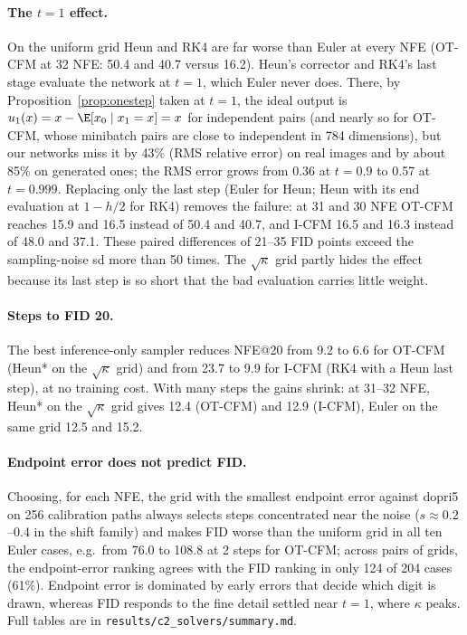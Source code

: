 \paragraph{The $t=1$ effect.} On the uniform grid Heun and RK4 are far worse than Euler at every NFE (OT-CFM at 32 NFE: 50.4 and 40.7 versus 16.2). Heun's corrector and RK4's last stage evaluate the network at $t=1$, which Euler never does. There, by Proposition~\ref{prop:onestep} taken at $t=1$, the ideal output is $u_1(x)=x-\E[x_0\mid x_1=x]=x$ for independent pairs (and nearly so for OT-CFM, whose minibatch pairs are close to independent in 784 dimensions), but our networks miss it by 43\% (RMS relative error) on real images and by about 85\% on generated ones; the RMS error grows from 0.36 at $t=0.9$ to 0.57 at $t=0.999$. Replacing only the last step (Euler for Heun; Heun with its end evaluation at $1-h/2$ for RK4) removes the failure: at 31 and 30 NFE OT-CFM reaches 15.9 and 16.5 instead of 50.4 and 40.7, and I-CFM 16.5 and 16.3 instead of 48.0 and 37.1. These paired differences of 21--35 FID points exceed the sampling-noise sd more than 50 times. The $\sqrt\kappa$ grid partly hides the effect because its last step is so short that the bad evaluation carries little weight. %
\paragraph{Steps to FID 20.} The best inference-only sampler reduces NFE@20 from 9.2 to 6.6 for OT-CFM (Heun* on the $\sqrt\kappa$ grid) and from 23.7 to 9.9 for I-CFM (RK4 with a Heun last step), at no training cost. With many steps the gains shrink: at 31--32 NFE, Heun* on the $\sqrt\kappa$ grid gives 12.4 (OT-CFM) and 12.9 (I-CFM), Euler on the same grid 12.5 and 15.2.
\paragraph{Endpoint error does not predict FID.} Choosing, for each NFE, the grid with the smallest endpoint error against dopri5 on 256 calibration paths always selects steps concentrated near the noise ($s\approx0.2$--0.4 in the shift family) and makes FID worse than the uniform grid in all ten Euler cases, e.g.\ from 76.0 to 108.8 at 2 steps for OT-CFM; across pairs of grids, the endpoint-error ranking agrees with the FID ranking in only 124 of 204 cases (61\%). Endpoint error is dominated by early errors that decide which digit is drawn, whereas FID responds to the fine detail settled near $t=1$, where $\kappa$ peaks. Full tables are in \texttt{results/c2\_solvers/summary.md}.

